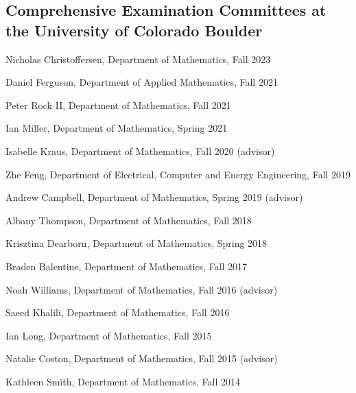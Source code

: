 \documentclass[letterpaper]{article}
\renewenvironment{itemize}{
  \begin{list}{}{
    \setlength{\leftmargin}{1em}
  }
}{
  \end{list}
}
\begin{document}
\subsection*{Comprehensive Examination Committees at the University of Colorado Boulder} 
\begin{itemize}
	\item Nicholas Christoffersen, Department of Mathematics, Fall 2023
	\item Daniel Ferguson, Department of Applied Mathematics, Fall 2021
	\item Peter Rock II, Department of Mathematics, Fall 2021
	\item Ian Miller, Department of Mathematics, Spring 2021
	\item Isabelle Kraus, Department of Mathematics, Fall 2020 (advisor)
	\item Zhe Feng, Department of Electrical, Computer and Energy Engineering, Fall 2019  
	\item Andrew Campbell, Department of Mathematics, Spring 2019 (advisor) 
	\item Albany Thompson, Department of Mathematics, Fall 2018 
	\item Krisztina Dearborn, Department of Mathematics, Spring 2018 
	\item Braden Balentine, Department of Mathematics, Fall 2017 
	\item Noah Williams, Department of Mathematics, Fall 2016 (advisor) 
	\item Saeed Khalili, Department of Mathematics, Fall 2016 
	\item Ian Long, Department of Mathematics, Fall 2015 
	\item Natalie Coston, Department of Mathematics, Fall 2015 (advisor)
	\item Kathleen Smith, Department of Mathematics, Fall 2014

\end{itemize}
\end{document}
